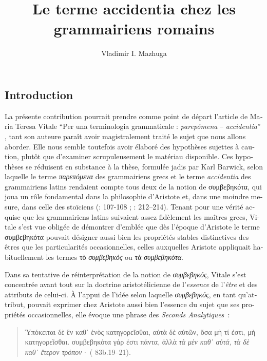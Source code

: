 \documentclass[output=paper]{langsci/langscibook}
\title{Le terme {accidentia} chez les grammairiens romains}
\author{Vladimir I. Mazhuga\affiliation{Saint Petersburg Institute of History, RAS}}
\begin{document}
\begin{otherlanguage}{french}
\maketitle

\section{Introduction} 
La présente contribution pourrait prendre comme point de départ l’article de Maria Teresa Vitale “Per una terminologia grammaticale : \textit{parepómena} – \textit{accidentia}” \citep{vitale_per_1982}, tant son auteure paraît avoir magistralement traité le sujet que nous allons aborder. Elle nous semble toutefois avoir élaboré des hypothèses sujettes à caution, plutôt que d’examiner scrupuleusement le matériau disponible. Ces hypothèses se réduisent en substance à la thèse, formulée jadis par Karl Barwick, selon laquelle le terme \textit{παρεπόμενα} des grammairiens grecs et le terme \textit{accidentia} des grammairiens latins rendaient compte tous deux de la notion de συμβεβηκότα, qui joua un rôle fondamental dans la philosophie d’Aristote et, dans une moindre mesure, dans celle des stoïciens (\citealt{barwick_remmius_1922}: 107-108 ; \citealt{vitale_per_1982}: 212–214). Tenant pour une vérité acquise que les grammairiens latins suivaient assez fidèlement les maîtres grecs, Vitale s’est vue obligée de démontrer d’emblée que dès l’époque d’Aristote le terme συμβεβηκότα pouvait désigner aussi bien les propriétés stables distinctives des êtres que les particularités occasionnelles, celles auxquelles Aristote appliquait habituellement les termes τὸ \textit{συμβεβηκός} ou τὰ \textit{συμβεβηκότα}. 

Dans sa tentative de réinterprétation de la notion de \textit{συμβεβηκός}, Vitale s’est concentrée avant tout sur la doctrine aristotélicienne de l’\textit{essence} de l’\textit{être} et des attributs de celui-ci. À l’appui de l’idée selon laquelle \textit{συμβεβηκός}, en tant qu’attribut, pouvait exprimer chez Aristote aussi bien l’essence du sujet que ses propriétés occasionnelles, elle évoque une phrase des \textit{Seconds Analytiques~}:

\begin{quote}
    Ὑπόκειται δὲ ἓν καθ᾿ ἑνὸς κατηγορεῖσθαι, αὐτὰ δὲ αὐτῶν, ὅσα μὴ τί ἐστι, μὴ κατηγορεῖσθαι. συμβεβηκότα γάρ ἐστι πάντα, ἀλλὰ \textit{τὰ μὲν καθ᾿ αὑτά, τὰ δὲ καθ᾿ ἕτερον τρόπον·} ( 83b.19–21).


\end{quote}
\end{otherlanguage}
\end{document}

